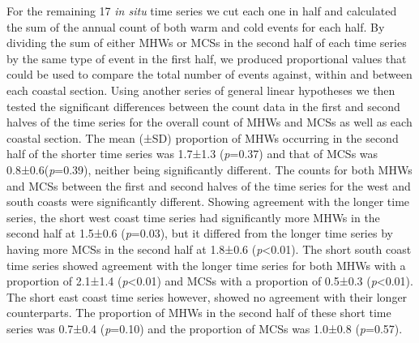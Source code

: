 \documentclass[a4paper,10pt,review]{elsarticle}
\begin{document}
For the remaining 17 \emph{in situ} time series we cut each one in half and calculated the sum of the annual count of both warm and cold events for each half. By dividing the sum of either MHWs or MCSs in the second half of each time series by the same type of event in the first half, we produced proportional values that could be used to compare the total number of events against, within and between each coastal section. Using another series of general linear hypotheses \citep{Hothorn2008} we then tested the significant differences between the count data in the first and second halves of the time series for the overall count of MHWs and MCSs as well as each coastal section. The mean (±SD) proportion of MHWs occurring in the second half of the shorter time series was 1.7±1.3 (\emph{p}=0.37) and that of MCSs was 0.8±0.6(\emph{p}=0.39), neither being significantly different. The counts for both MHWs and MCSs between the first and second halves of the time series for the west and south coasts were significantly different. Showing agreement with the longer time series, the short west coast time series had significantly more MHWs in the second half at 1.5±0.6 (\emph{p}=0.03), but it differed from the longer time series by having more MCSs in the second half at 1.8±0.6 (\emph{p}<0.01). The short south coast time series showed agreement with the longer time series for both MHWs with a proportion of 2.1±1.4 (\emph{p}<0.01) and MCSs with a proportion of 0.5±0.3 (\emph{p}<0.01). The short east coast time series however, showed no agreement with their longer counterparts. The proportion of MHWs in the second half of these short time series was 0.7±0.4 (\emph{p}=0.10) and the proportion of MCSs was 1.0±0.8 (\emph{p}=0.57).
\end{document}
